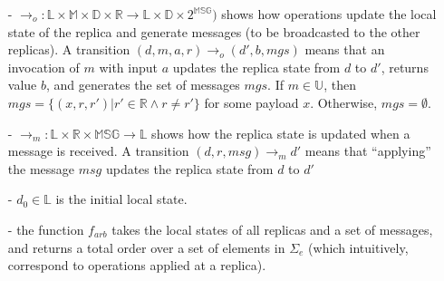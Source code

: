 \begin{itemize}
\setlength{\itemsep}{0.5pt}
\item[-] $\rightarrow_o: \mathbb{L} \times \mathbb{M} \times \mathbb{D} \times \mathbb{R} \rightarrow \mathbb{L} \times \mathbb{D} \times 2^{\mathbb{MSG}})$ shows how operations update the local state of the replica and generate messages (to be broadcasted to the other replicas). A transition $(d,m,a,r) \rightarrow_o (d',b,\mathit{mgs})$ means that an invocation of $m$ with input $a$ updates the replica state from $d$ to $d'$, returns value $b$, and generates the set of messages $\mathit{mgs}$.
If $m \in \mathbb{U}$, then $\mathit{mgs} = \{ (x,r,r') \vert r' \in \mathbb{R} \wedge r \neq r' \}$ for some payload $x$. Otherwise, $\mathit{mgs} = \emptyset$.

\item[-] $\rightarrow_m: \mathbb{L} \times \mathbb{R} \times \mathbb{MSG} \rightarrow \mathbb{L}$ shows how the replica state is updated when a message is received. A transition $(d,r,\mathit{msg}) \rightarrow_m d'$ means that ``applying'' the message $\mathit{msg}$ updates the replica state from $d$ to $d'$

\item[-] $d_0 \in \mathbb{L}$ is the initial local state.

\item[-] the function $f_{\mathit{arb}}$ takes the local states of all replicas and a set of messages, and returns a total order over a set of elements in $\Sigma_e$ (which intuitively, correspond to operations applied at a replica). %
%
%
%
\end{itemize}


